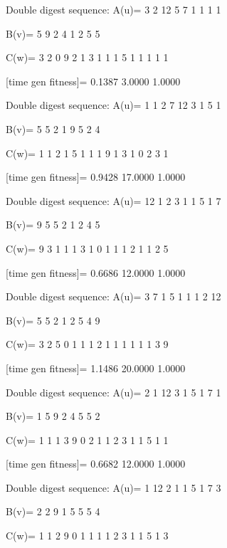 Double digest sequence:
A(u)=
     3     2    12     5     7     1     1     1     1

B(v)=
     5     9     2     4     1     2     5     5

C(w)=
     3     2     0     9     2     1     3     1     1     1     5     1     1     1     1     1

[time gen fitness]=
    0.1387    3.0000    1.0000

Double digest sequence:
A(u)=
     1     1     2     7    12     3     1     5     1

B(v)=
     5     5     2     1     9     5     2     4

C(w)=
     1     1     2     1     5     1     1     1     9     1     3     1     0     2     3     1

[time gen fitness]=
    0.9428   17.0000    1.0000

Double digest sequence:
A(u)=
    12     1     2     3     1     1     5     1     7

B(v)=
     9     5     5     2     1     2     4     5

C(w)=
     9     3     1     1     1     3     1     0     1     1     1     2     1     1     2     5

[time gen fitness]=
    0.6686   12.0000    1.0000

Double digest sequence:
A(u)=
     3     7     1     5     1     1     1     2    12

B(v)=
     5     5     2     1     2     5     4     9

C(w)=
     3     2     5     0     1     1     1     2     1     1     1     1     1     1     3     9

[time gen fitness]=
    1.1486   20.0000    1.0000

Double digest sequence:
A(u)=
     2     1    12     3     1     5     1     7     1

B(v)=
     1     5     9     2     4     5     5     2

C(w)=
     1     1     1     3     9     0     2     1     1     2     3     1     1     5     1     1

[time gen fitness]=
    0.6682   12.0000    1.0000

Double digest sequence:
A(u)=
     1    12     2     1     1     5     1     7     3

B(v)=
     2     2     9     1     5     5     5     4

C(w)=
     1     1     2     9     0     1     1     1     1     2     3     1     1     5     1     3

